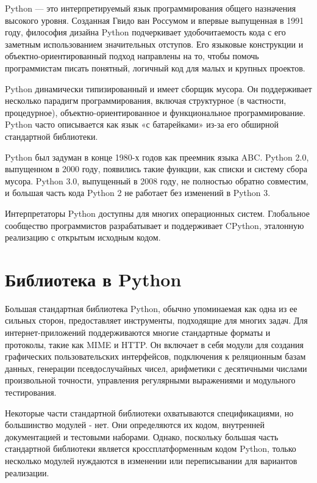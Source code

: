 \documentclass[12pt,a4paper]{report}
\begin{document}
Python --- это интерпретируемый язык программирования общего назначения высокого уровня. Созданная Гвидо ван Россумом и впервые выпущенная в 1991 году, философия дизайна Python подчеркивает удобочитаемость кода с его заметным использованием значительных отступов. Его языковые конструкции и объектно-ориентированный подход направлены на то, чтобы помочь программистам писать понятный, логичный код для малых и крупных проектов.

Python динамически типизированный и имеет сборщик мусора. Он поддерживает несколько парадигм программирования, включая структурное (в частности, процедурное), объектно-ориентированное и функциональное программирование. Python часто описывается как язык «с батарейками» из-за его обширной стандартной библиотеки.

Python был задуман в конце 1980-х годов как преемник языка ABC. Python 2.0, выпущенном в 2000 году, появились такие функции, как списки и систему сбора мусора. Python 3.0, выпущенный в 2008 году, не полностью обратно совместим, и большая часть кода Python 2 не работает без изменений в Python 3.

Интерпретаторы Python доступны для многих операционных систем. Глобальное сообщество программистов разрабатывает и поддерживает CPython, эталонную реализацию с открытым исходным кодом.

\section{Библиотека в Python}
Большая стандартная библиотека Python, обычно упоминаемая как одна из ее сильных сторон, предоставляет инструменты, подходящие для многих задач. Для интернет-приложений поддерживаются многие стандартные форматы и протоколы, такие как MIME и HTTP. Он включает в себя модули для создания графических пользовательских интерфейсов, подключения к реляционным базам данных, генерации псевдослучайных чисел, арифметики с десятичными числами произвольной точности, управления регулярными выражениями и модульного тестирования.

Некоторые части стандартной библиотеки охватываются спецификациями, но большинство модулей - нет. Они определяются их кодом, внутренней документацией и тестовыми наборами. Однако, поскольку большая часть стандартной библиотеки является кроссплатформенным кодом Python, только несколько модулей нуждаются в изменении или переписывании для вариантов реализации.
\end{document}
